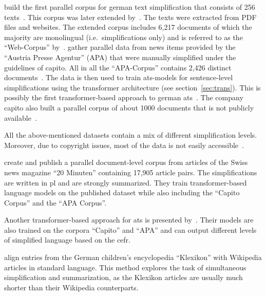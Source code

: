 \textcite{klaper-etal-2013-building} build the first parallel corpus for german text simplification that consists of 256 texts~\autocite{ebeling2022}.
This corpus was later extended by~\textcite{battisti-etal-2020-corpus}.
The texts were extracted from PDF files and websites.
The extended corpus includes 6,217 documents of which the majority are monolingual (i.e.\ simplifications only) and is referred to as the \enquote{Web-Corpus} by~\textcite{ebeling2022}.
\textcite{sauberli-etal-2020-benchmarking} gather parallel data from news items provided by the \enquote{Austria Presse Agentur} (APA) that were manually simplified under the guidelines of \gls{capito}.
All in all the \enquote{APA-Corpus} contains 2,426 distinct documents~\autocite{ebeling2022}.
The data is then used to train \gls{ats}-models for sentence-level simplifications using the transformer architecture (see section~\ref{sec:trans}). %
This is possibly the first transformer-based approach to german \gls{ats}~\autocite{Ansch_tz_2023}.
The company \gls{capito} also built a parallel corpus of about 1000 documents that is not publicly available~\autocite{ebeling2022}.

All the above-mentioned datasets contain a mix of different simplification levels.
Moreover, due to copyright issues, most of the data is not easily accessible~\autocite{stodden-etal-2023-deplain}.

\textcite{rios-etal-2021-new} create and publish a parallel document-level corpus from articles of the Swiss news magazine \enquote{20 Minuten} containing 17,905 article pairs.
The simplifications are written in \gls{pl} and are strongly summarized.
They train transformer-based language models on the published dataset while also including the \enquote{Capito Corpus} and the \enquote{APA Corpus}.

Another transformer-based approach for \gls{ats} is presented by~\textcite{spring-etal-2021-exploring}.
Their models are also trained on the corpora \enquote{Capito} and \enquote{APA} and can output different levels of simplified language based on the \gls{cefr}.

\textcite{aumiller2022klexikon} align entries from the German children’s encyclopedia \enquote{Klexikon} with Wikipedia articles in standard language.
This method explores the task of simultaneous simplification and summarization, as the Klexikon articles are usually much shorter than their Wikipedia counterparts.

